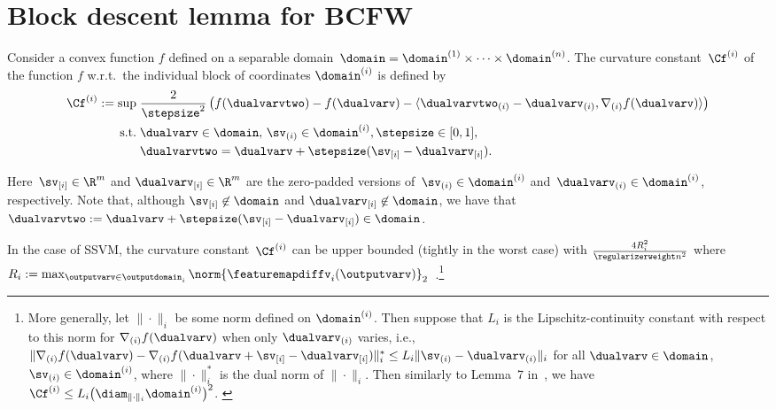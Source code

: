 \documentclass{article}
\begin{document}
\section{Block descent lemma for BCFW \label{app:descent_lemma}}

\begin{definition}
    \label{def:curvature_const}
    Consider a convex function $f$ defined on a separable domain~$\domain=\domain^{(1)} \times\dots\times \domain^{(n)}$.
    The curvature constant~$\Cf^{(i)}$ of the function $f$ w.r.t.\ the individual block of coordinates $\domain^{(i)}$ is defined by
    \begin{align}
    \notag \Cf^{(i)} := \sup\; &\frac{2}{\stepsize^2}\left( f(\dualvarvtwo)-f(\dualvarv)-\langle \dualvarvtwo_{(i)}-\dualvarv_{(i)}, \nabla_{(i)} f(\dualvarv)\rangle \right) \\
    \notag \mbox{s.t.}\; & \dualvarv\in\domain,\,\sv_{(i)}\in \domain^{(i)}, \stepsize\in[0,1], \\
    \label{eqn:CfProduct} & \dualvarvtwo = \dualvarv+\stepsize(\sv_{[i]}-\dualvarv_{[i]}).
    \end{align}
\end{definition}
Here~$\sv_{[i]} \in \R^m$ and $\dualvarv_{[i]} \in \R^m$ are the zero-padded versions of~$\sv_{(i)}\in \domain^{(i)}$ and~$\dualvarv_{(i)}\in \domain^{(i)}$, respectively.
Note that, although $\sv_{[i]} \not\in \domain$ and $\dualvarv_{[i]} \not\in \domain$, we have that $\dualvarvtwo := \dualvarv+\stepsize(\sv_{[i]}-\dualvarv_{[i]}) \in \domain$.

In the case of SSVM, the curvature constant~$\Cf^{(i)}$ can be upper bounded (tightly in the worst case) with $\frac{4R_i^2}{\regularizerweight n^2}$ where
$R_i:= \max_{\outputvarv \in \outputdomain_i}\norm{\featuremapdiffv_i(\outputvarv)}_2$~\citep[Appendix~A]{lacosteJulien13bcfw}.\footnote{More generally, let $\|\cdot \|_i$ be some norm defined on $\domain^{(i)}$. Then suppose that $L_i$ is the Lipschitz-continuity constant with respect to this norm for $\nabla_{(i)} f(\dualvarv)$ when only $\dualvarv_{(i)}$ varies, i.e., $\| \nabla_{(i)} f(\dualvarv) - \nabla_{(i)} f(\dualvarv + \sv_{[i]} - \dualvarv_{[i]}) \|_i^* \leq L_i \| \sv_{(i)} -  \dualvarv_{(i)} \|_i$ for all $\dualvarv \in \domain$, $\sv_{(i)} \in \domain^{(i)}$, where $\|\cdot\|_i^*$ is the dual norm of $\|\cdot\|_i$. Then similarly to Lemma~7 in~, we have $\Cf^{(i)} \leq L_i \big(\diam_{\|\cdot\|_i} \domain^{(i)} \big)^2$.
\label{foot:Cfi}}
\end{document}

